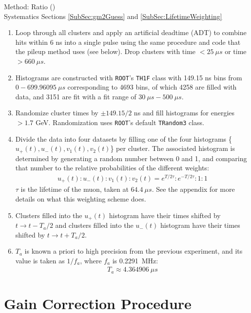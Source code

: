 	Method: Ratio () \\
	\noindent Systematics Sections \ref{SubSec:gm2Guess} and \ref{SubSec:LifetimeWeighting}

	\begin{enumerate}
		\item{Loop through all clusters and apply an artificial deadtime (ADT) to combine hits within 6 ns into a single pulse using the same procedure and code that the pileup method uses (see below). Drop clusters with time $< \SI{25}{\mu s}$ or time $> \SI{660}{\mu s}$.}
		\item{Histograms are constructed with \texttt{ROOT}'s \texttt{TH1F} class with 149.15 ns bins from $0 - \SI{699.96095}{\mu s}$ corresponding to 4693 bins, of which 4258 are filled with data, and 3151 are fit with a fit range of $\SI{30}{\mu s} - \SI{500}{\mu s}$.}
		\item{Randomize cluster times by $\pm 149.15/2$ ns and fill histograms for energies $> 1.7$ GeV. Randomization uses \texttt{ROOT}'s default \texttt{TRandom3} class.}
		\item{Divide the data into four datasets by filling one of the four histograms \{$u_{+}(t), u_{-}(t), v_{1}(t), v_{2}(t)$\} per cluster. The associated histogram is determined by generating a random number between 0 and 1, and comparing that number to the relative probabilities of the different weights:
			\begin{align}
				u_{+}(t) : u_{-}(t) : v_{1}(t) : v_{2}(t) = e^{T/2\tau} : e^{-T/2\tau} : 1 : 1
			\end{align}
		$\tau$ is the lifetime of the muon, taken at $\SI{64.4}{\mu s}$. See the appendix for more details on what this weighting scheme does.}
		\item{Clusters filled into the $u_{+}(t)$ histogram have their times shifted by $t \rightarrow t - T_{a}/2$ and clusters filled into the $u_{-}(t)$ histogram have their times shifted by $t \rightarrow t + T_{a}/2$.}
		\item{$T_{a}$ is known a priori to high precision from the previous experiment, and its value is taken as $1/f_{a}$, where $f_{a}$ is \SI{0.2291}{MHz}:
			\begin{align}
				T_{a} \approx \SI{4.364906}{\mu s}
			\label{eq:Ta}
			\end{align}}
	\end{enumerate}

\section{Gain Correction Procedure}

